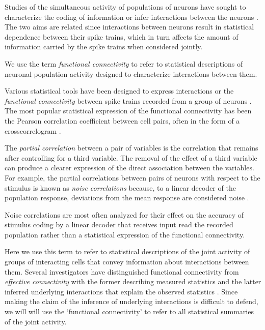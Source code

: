 Studies of the simultaneous activity of populations of neurons have sought to characterize the coding of information or infer interactions between the neurons \citep{Averbeck:2006,Stevenson:2008}. The two aims are related since interactions between neurons result in statistical dependence between their spike trains, which in turn affects the amount of information carried by the spike trains when considered jointly.

We use the term \emph{functional connectivity} to refer to statistical descriptions of neuronal population activity designed to characterize interactions between them. 


Various statistical tools have been designed to express interactions or the \emph{functional connectivity} between spike trains recorded from a group of neurons . The most popular statistical expression of the functional connectivity has been the Pearson correlation coefficient between cell pairs, often in the form of a crosscorrelogram \citep{Gerstein:1969, Denman:2013, Sadovsky:2014}. 

The \emph{partial correlation} between a pair of variables is the correlation that remains after controlling for a third variable. The removal of the effect of a third variable can produce a clearer expression of the direct association between the variables.
For example, the partial correlations between pairs of neurons with respect to the stimulus is known as \emph{noise correlations} because, to a linear decoder of the population response, deviations from the mean response are considered noise \citep{Zohary:1994}. 

Noise correlations are most often analyzed for their effect on the accuracy of stimulus coding by a linear decoder that receives input read the recorded population \citep{Averbeck:2006,Ecker:2011} rather than a statistical expression of the functional connectivity. 



Here we use this term to refer to statistical descriptions of the joint activity of groups of interacting cells that convey information about interactions between them.  Several investigators have distinguished functional connectivity from \emph{effective connectivity} with the former describing measured statistics and the latter inferred underlying interactions that explain the observed statistics \citep{Aertsen:1989,Friston:2011}. Since making the claim of the inference of underlying interactions is difficult to defend, we will will use the `functional connectivity' to refer to all statistical summaries of the joint activity. 

